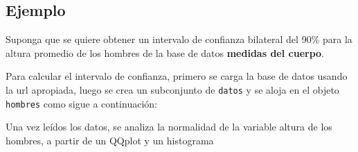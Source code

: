 \documentclass[
]{book}
\makeatletter
\newenvironment{Shaded}{\begin{snugshade}}{\end{snugshade}}
\newcommand{\AttributeTok}[1]{\textcolor[rgb]{0.77,0.63,0.00}{#1}}
\newcommand{\CommentTok}[1]{\textcolor[rgb]{0.56,0.35,0.01}{\textit{#1}}}
\newcommand{\DecValTok}[1]{\textcolor[rgb]{0.00,0.00,0.81}{#1}}
\newcommand{\FunctionTok}[1]{\textcolor[rgb]{0.00,0.00,0.00}{#1}}
\newcommand{\NormalTok}[1]{#1}
\newcommand{\OtherTok}[1]{\textcolor[rgb]{0.56,0.35,0.01}{#1}}
\newcommand{\SpecialCharTok}[1]{\textcolor[rgb]{0.00,0.00,0.00}{#1}}
\newcommand{\StringTok}[1]{\textcolor[rgb]{0.31,0.60,0.02}{#1}}
\newenvironment{kframe}{%
\medskip{}
\setlength{\fboxsep}{.8em}
 \def\at@end@of@kframe{}%
 \ifinner\ifhmode%
  \def\at@end@of@kframe{\end{minipage}}%
  \begin{minipage}{\columnwidth}%
 \fi\fi%
 \def\FrameCommand##1{\hskip\@totalleftmargin \hskip-\fboxsep
 \colorbox{shadecolor}{##1}\hskip-\fboxsep
     \hskip-\linewidth \hskip-\@totalleftmargin \hskip\columnwidth}%
 \MakeFramed {\advance\hsize-\width
   \@totalleftmargin\z@ \linewidth\hsize
   \@setminipage}}%
 {\par\unskip\endMakeFramed%
 \at@end@of@kframe}
\renewenvironment{Shaded}{\begin{kframe}}{\end{kframe}}
\makeatother
\begin{document}
\hypertarget{ejemplo-55}{%
\subsection*{Ejemplo}\label{ejemplo-55}}

Suponga que se quiere obtener un intervalo de confianza bilateral del 90\% para la altura promedio de los hombres de la base de datos \textbf{medidas del cuerpo}.

Para calcular el intervalo de confianza, primero se carga la base de datos usando la url apropiada, luego se crea un subconjunto de \texttt{datos} y se aloja en el objeto \texttt{hombres} como sigue a continuación:

\begin{Shaded}
\end{Shaded}

Una vez leídos los datos, se analiza la normalidad de la variable altura de los hombres, a partir de un QQplot y un histograma

\begin{Shaded}
\end{Shaded}
\end{document}
